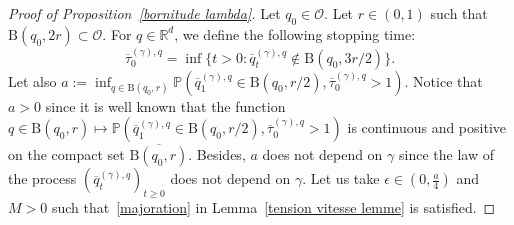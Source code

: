 \documentclass[preprint,EJP]{ejpecp}
\begin{document}
\begin{proof}[Proof of Proposition~\ref{bornitude lambda}]
Let $q_0\in\mathcal{O}$. Let $r\in(0,1)$ such that $\mathrm{B}(q_0,2r)\subset\mathcal{O}$. For $q\in\mathbb{R}^d$, we define the following stopping time: $$\overline{\tau}^{(\gamma),q}_0=\inf \{t>0: \overline{q}^{(\gamma),q}_t\notin\mathrm{B}(q_0,3r/2)\}.$$ Let also $a:=\inf_{q\in\mathrm{B}(q_0,r)}\mathbb{P}(\overline{q}^{(\gamma),q}_1\in \mathrm{B}(q_0,r/2),\overline{\tau}^{(\gamma),q}_0>1)$. Notice that $a>0$ since it is well known that the function $q\in\mathrm{B}(q_0,r)\mapsto\mathbb{P}(\overline{q}^{(\gamma),q}_1\in \mathrm{B}(q_0,r/2),\overline{\tau}^{(\gamma),q}_0>1)$ is continuous and positive on the compact set $\overline{\mathrm{B}(q_0,r)}$. Besides, $a$ does not depend on $\gamma$ since the law of the process $(\overline{q}^{(\gamma),q}_t)_{t \geq 0}$ does not depend on $\gamma$. Let us take $\epsilon\in(0,\frac{a}{4})$ and $M>0$ such that~\eqref{majoration} in Lemma~\ref{tension vitesse lemme} is satisfied. 


\end{proof}
\end{document}

